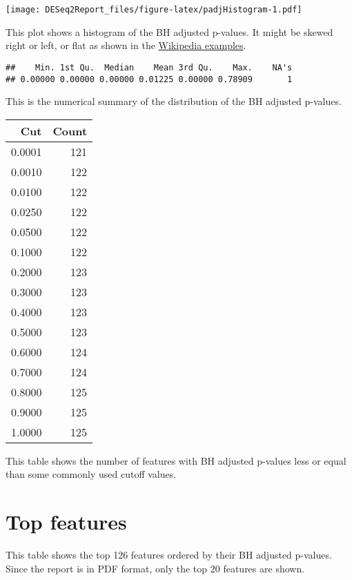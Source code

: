 \documentclass[]{article}
\begin{document}
\texttt{[image: DESeq2Report\_files/figure-latex/padjHistogram-1.pdf]}

This plot shows a histogram of the BH adjusted p-values. It might be
skewed right or left, or flat as shown in the
\href{https://en.wikipedia.org/wiki/Histogram\#Examples}{Wikipedia
examples}.

\begin{verbatim}
##    Min. 1st Qu.  Median    Mean 3rd Qu.    Max.    NA's 
## 0.00000 0.00000 0.00000 0.01225 0.00000 0.78909       1
\end{verbatim}

This is the numerical summary of the distribution of the BH adjusted
p-values.

\begin{longtable}[]{@{}rr@{}}
\toprule
Cut & Count\tabularnewline
\midrule
\endhead
0.0001 & 121\tabularnewline
0.0010 & 122\tabularnewline
0.0100 & 122\tabularnewline
0.0250 & 122\tabularnewline
0.0500 & 122\tabularnewline
0.1000 & 122\tabularnewline
0.2000 & 123\tabularnewline
0.3000 & 123\tabularnewline
0.4000 & 123\tabularnewline
0.5000 & 123\tabularnewline
0.6000 & 124\tabularnewline
0.7000 & 124\tabularnewline
0.8000 & 125\tabularnewline
0.9000 & 125\tabularnewline
1.0000 & 125\tabularnewline
\bottomrule
\end{longtable}

This table shows the number of features with BH adjusted p-values less
or equal than some commonly used cutoff values.

\section{Top features}\label{top-features}

This table shows the top 126 features ordered by their BH adjusted
p-values. Since the report is in PDF format, only the top 20 features
are shown.
\end{document}
